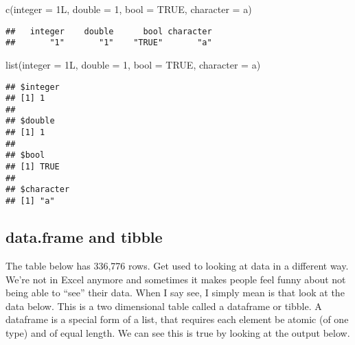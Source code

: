\documentclass[
]{book}
\newenvironment{Shaded}{\begin{snugshade}}{\end{snugshade}}
\newcommand{\AttributeTok}[1]{\textcolor[rgb]{0.77,0.63,0.00}{#1}}
\newcommand{\ConstantTok}[1]{\textcolor[rgb]{0.00,0.00,0.00}{#1}}
\newcommand{\DecValTok}[1]{\textcolor[rgb]{0.00,0.00,0.81}{#1}}
\newcommand{\FunctionTok}[1]{\textcolor[rgb]{0.00,0.00,0.00}{#1}}
\newcommand{\NormalTok}[1]{#1}
\newcommand{\StringTok}[1]{\textcolor[rgb]{0.31,0.60,0.02}{#1}}
\begin{document}
\begin{Shaded}
\begin{Highlighting}[]
\FunctionTok{c}\NormalTok{(}\AttributeTok{integer =}\NormalTok{ 1L, }\AttributeTok{double =} \DecValTok{1}\NormalTok{, }\AttributeTok{bool =} \ConstantTok{TRUE}\NormalTok{, }\AttributeTok{character =} \StringTok{\textquotesingle{}a\textquotesingle{}}\NormalTok{)}
\end{Highlighting}
\end{Shaded}

\begin{verbatim}
##   integer    double      bool character 
##       "1"       "1"    "TRUE"       "a"
\end{verbatim}

\begin{Shaded}
\begin{Highlighting}[]
\FunctionTok{list}\NormalTok{(}\AttributeTok{integer =}\NormalTok{ 1L, }\AttributeTok{double =} \DecValTok{1}\NormalTok{, }\AttributeTok{bool =} \ConstantTok{TRUE}\NormalTok{, }\AttributeTok{character =} \StringTok{\textquotesingle{}a\textquotesingle{}}\NormalTok{)}
\end{Highlighting}
\end{Shaded}

\begin{verbatim}
## $integer
## [1] 1
## 
## $double
## [1] 1
## 
## $bool
## [1] TRUE
## 
## $character
## [1] "a"
\end{verbatim}

\hypertarget{data.frame-and-tibble}{%
\subsection{data.frame and tibble}\label{data.frame-and-tibble}}

The table below has 336,776 rows. Get used to looking at data in a different way. We're not in Excel anymore and sometimes it makes people feel funny about not being able to ``see'' their data. When I say see, I simply mean is that look at the data below. This is a two dimensional table called a dataframe or tibble. A dataframe is a special form of a list, that requires each element be atomic (of one type) and of equal length. We can see this is true by looking at the output below.
\end{document}

